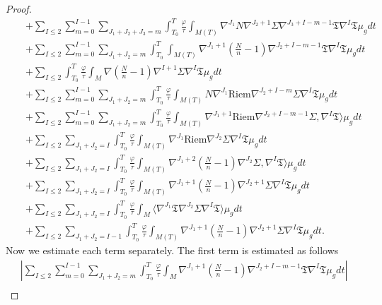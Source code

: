 \documentclass{amsart}
\begin{document}
\begin{proof}
\begin{align}
&&+\sum_{I\leq 2}\sum_{m=0}^{I-1}\sum_{J_{1}+J_{2}+J_{3}=m}\int_{T_{0}}^{T}\frac{\varphi}{\tau}\int_{M(T)}\nabla^{J_{1}}N\nabla^{J_{2}+1}\Sigma\nabla^{J_{3}+I-m-1}\mathfrak{T}\nabla^{I}\mathfrak{T}\mu_{g}dt\\\nonumber 
&&+\sum_{I\leq 2}\sum_{m=0}^{I-1}\sum_{J_{1}+J_{2}=m}\int_{T_{0}}^{T}\int_{M(T)}\nabla^{J_{1}+1}(\frac{N}{n}-1)\nabla^{J_{2}+I-m-1}\mathfrak{T}\nabla^{I}\mathfrak{T}\mu_{g}dt\\\nonumber 
&&+\sum_{I\leq 2}\int_{T_{0}}^{T}\frac{\varphi}{\tau}\int_{M}\nabla(\frac{N}{n}-1)\nabla^{I+1}\Sigma\nabla^{I}\mathfrak{T}\mu_{g}dt\\\nonumber
&&+\sum_{I\leq 2}\sum_{m=0}^{I-1}\sum_{J_{1}+J_{2}=m}\int_{T_{0}}^{T}\frac{\varphi}{\tau}\int_{M(T)}N\nabla^{J_{1}}\text{Riem}\nabla^{J_{2}+I-m}\Sigma\nabla^{I}\mathfrak{T}\mu_{g}dt\\\nonumber 
&&+\sum_{I\leq 2}\sum_{m=0}^{I-1}\sum_{J_{1}+J_{2}=m}\int_{T_{0}}^{T}\frac{\varphi}{\tau}\int_{M(T)}\nabla^{J_{1}+1}\text{Riem}\nabla^{J_{2}+I-m-1}\Sigma,\nabla^{I}\mathfrak{T}\rangle\mu_{g}dt\\\nonumber 
&&+\sum_{I\leq 2}\sum_{J_{1}+J_{2}=I}\int_{T_{0}}^{T}\frac{\varphi}{\tau}\int_{M(T)}\nabla^{J_{1}}\text{Riem}\nabla^{J_{2}}\Sigma\nabla^{I}\mathfrak{T}\mu_{g}dt\\\nonumber 
&&+\sum_{I\leq 2}\sum_{J_{1}+J_{2}=I}\int_{T_{0}}^{T}\frac{\varphi}{\tau}\int_{M(T)}\nabla^{J_{1}+2}(\frac{N}{n}-1)\nabla^{J_{2}}\Sigma,\nabla^{I}\mathfrak{T}\rangle\mu_{g}dt\\\nonumber &&+\sum_{I\leq 2}\sum_{J_{1}+J_{2}=I}\int_{T_{0}}^{T}\frac{\varphi}{\tau}\int_{M(T)}\nabla^{J_{1}+1}(\frac{N}{n}-1)\nabla^{J_{2}+1}\Sigma\nabla^{I}\mathfrak{T}\mu_{g}dt\\\nonumber 
&&+\sum_{I\leq 2}\sum_{J_{1}+J_{2}=I}\int_{T_{0}}^{T}\frac{\varphi}{\tau}\int_{M}\langle\nabla^{J_{1}}\mathfrak{T}\nabla^{J_{2}}\Sigma \nabla^{I}\mathfrak{T}\rangle\mu_{g}dt\\\nonumber 
&&+\sum_{I\leq 2}\sum_{J_{1}+J_{2}=I-1}\int_{T_{0}}^{T}\frac{\varphi}{\tau}\int_{M(T)}\nabla^{J_{1}+1}(\frac{N}{n}-1)\nabla^{J_{2}+1}\Sigma\nabla^{I}\mathfrak{T}\mu_{g}dt.
\end{align}
Now we estimate each term separately. The first term is estimated as follows 
\begin{align}
|\sum_{I\leq 2}\sum_{m=0}^{I-1}\sum_{J_{1}+J_{2}=m}\int_{T_{0}}^{T}\frac{\varphi}{\tau}\int_{M}\nabla^{J_{1}+1}(\frac{N}{n}-1)\nabla^{J_{2}+I-m-1}\mathfrak{T}\nabla^{I}\mathfrak{T}\mu_{g}dt|\\\nonumber 

\end{align}
\end{proof}
\end{document}
